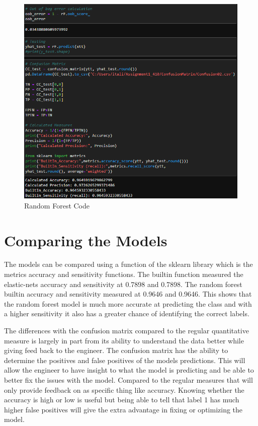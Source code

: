 \documentclass[conference]{IEEEtran}
\begin{document}
\begin{figure}[h]
  \centering
  \includegraphics[width=\linewidth]{RFCode.png}
  \caption{Random Forest Code}
\end{figure}

\section{Comparing the Models}
The models can be compared using a function of the sklearn library which is the metrics accuracy and sensitivity functions. The builtin function measured the elastic-nets accuracy and sensitivity at 0.7898 and 0.7898. The random forest builtin accuracy and sensitivity measured at 0.9646 and 0.9646. This shows that the random forest model is much more accurate at predicting the class and with a higher sensitivity it also has a greater chance of identifying the correct labels.

The differences with the confusion matrix compared to the regular quantitative measure is largely in part from its ability to understand the data better while giving feed back to the engineer. The confusion matrix has the ability to determine the positives and false positives of the models predictions. This will allow the engineer to have insight to what the model is predicting and be able to better fix the issues with the model. Compared to the regular measures that will only provide feedback on as specific thing like accuracy. Knowing whether the accuracy is high or low is useful but being able to tell that label 1 has much higher false positives will give the extra advantage in fixing or optimizing the model.
\end{document}
